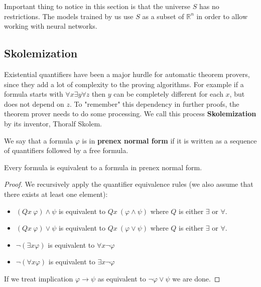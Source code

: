 Important thing to notice in this section is that the universe $S$ has no restrictions. The models trained by us use $S$ as a subset of $\mathbb{R}^n$ in order to allow working with neural networks. 

\subsection{Skolemization}
\label{section:skolem}
Existential quantifiers have been a major hurdle for automatic theorem provers, since they add a lot of complexity to the proving algorithms. For example if a formula starts with $\forall x \exists y \forall z$ then $y$ can be completely different for each $x$, but does not depend on $z$. To "remember" this dependency in further proofs, the theorem prover needs to do some processing. We call this process \textbf{Skolemization} by its inventor, Thoralf Skolem.

\begin{defn}
	We say that a formula $\varphi$ is in \textbf{prenex normal form} if it is written as a sequence of quantifiers followed by a free formula.
\end{defn}

\begin{thm}
	Every formula is equivalent to a formula in prenex normal form.
\end{thm}
\begin{proof}
	We recursively apply the quantifier equivalence rules (we also assume that there exists at least one element):
	\begin{itemize}
		\item $(Q x\ \varphi)\wedge\psi$ is equivalent to $Q x\ (\varphi\wedge\psi)$ where $Q$ is either $\exists$ or $\forall$. 
		\item $(Q x\ \varphi)\vee\psi$ is equivalent to $Q x\ (\varphi\vee\psi)$ where $Q$ is either $\exists$ or $\forall$. 
		\item $\neg(\exists x\varphi)$ is equivalent to $\forall x \neg \varphi$\footnotemark
		\item $\neg(\forall x\varphi)$ is equivalent to $\exists x \neg \varphi$
		\footnotemark[\value{footnote}]
	\end{itemize}
If we treat implication $\varphi \rightarrow \psi$ as equivalent to $\neg \varphi \vee \psi$ we are done.
\end{proof}

